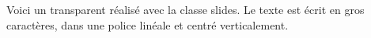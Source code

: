 \documentclass[a4paper]{slides}
\begin{document}
\begin{slide}

Voici un transparent réalisé avec la classe slides.
Le texte est écrit en gros caractères, dans une
police linéale et centré verticalement.

\end{slide}
\end{document}
